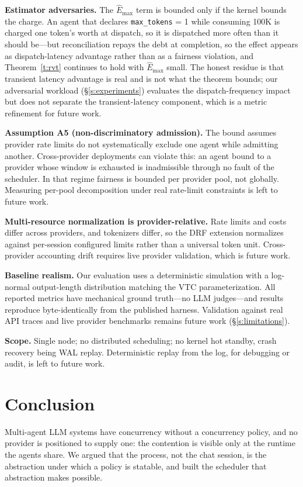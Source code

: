 \documentclass[letterpaper,11pt,leqno]{article}
\begin{document}
\textbf{Estimator adversaries.} The $\hat{E}_{\max}$ term is bounded only if the kernel bounds the charge. An agent that declares \texttt{max\_tokens} = 1 while consuming 100K is charged one token's worth at dispatch, so it is dispatched more often than it should be---but reconciliation repays the debt at completion, so the effect appears as dispatch-latency advantage rather than as a fairness violation, and Theorem~\ref{t:rvt} continues to hold with $\hat{E}_{\max}$ small. The honest residue is that transient latency advantage is real and is not what the theorem bounds; our adversarial workload (\S\ref{s:experiments}) evaluates the dispatch-frequency impact but does not separate the transient-latency component, which is a metric refinement for future work.

\textbf{Assumption A5 (non-discriminatory admission).} The bound assumes provider rate limits do not systematically exclude one agent while admitting another. Cross-provider deployments can violate this: an agent bound to a provider whose window is exhausted is inadmissible through no fault of the scheduler. In that regime fairness is bounded per provider pool, not globally. Measuring per-pool decomposition under real rate-limit constraints is left to future work.

\textbf{Multi-resource normalization is provider-relative.} Rate limits and costs differ across providers, and tokenizers differ, so the DRF extension normalizes against per-session configured limits rather than a universal token unit. Cross-provider accounting drift requires live provider validation, which is future work.

\textbf{Baseline realism.} Our evaluation uses a deterministic simulation with a log-normal output-length distribution matching the VTC parameterization. All reported metrics have mechanical ground truth---no LLM judges---and results reproduce byte-identically from the published harness. Validation against real API traces and live provider benchmarks remains future work (\S\ref{s:limitations}).

\textbf{Scope.} Single node; no distributed scheduling; no kernel hot standby, crash recovery being WAL replay. Deterministic replay from the log, for debugging or audit, is left to future work.

\section{Conclusion}\label{s:ccl}

Multi-agent LLM systems have concurrency without a concurrency policy, and no provider is positioned to supply one: the contention is visible only at the runtime the agents share. We argued that the process, not the chat session, is the abstraction under which a policy is statable, and built the scheduler that abstraction makes possible.
\end{document}
